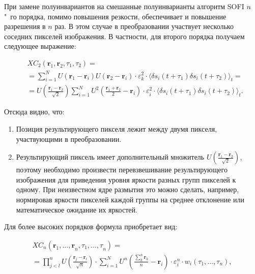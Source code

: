 При замене полуинвариантов на смешанные полуинварианты алгоритм SOFI $n$"~го порядка, помимо повышения резкости, обеспечивает и повышение разрешения в $n$ раз. В этом случае в преобразовании участвует несколько соседних пикселей изображения. В частности, для второго порядка получаем следующее выражение:

\begin{align*}
	&{XC}_2\left(\mathbf{r}_1,\mathbf{r}_2,\tau_1,\tau_2\right) = \\
	&= \sum_{i=1}^{N} {U\left(\mathbf{r}_1-\mathbf{r}_i\right)U\left(\mathbf{r}_2-\mathbf{r}_i\right)\cdot\varepsilon_k^2\cdot \langle \delta s_i\left(t+\tau_1\right)\delta s_i\left(t+\tau_2\right) \rangle_t} = \\
	&= U\left(\frac{\mathbf{r}_1-\mathbf{r}_2}{\sqrt2}\right) \sum_{i=1}^{N} {U^2\left(\frac{\mathbf{r}_1+\mathbf{r}_2}{2}-\mathbf{r}_i\right)\cdot\varepsilon_i^2\cdot \langle \delta s_i\left(t+\tau_1\right)\delta s_i\left(t+\tau_2\right) \rangle_t}.
\end{align*}

Отсюда видно, что:

\begin{enumerate}
	\item Позиция результирующего пикселя лежит между двумя пикселя, участвующими в преобразовании.
	\item Результирующий пиксель имеет дополнительный множитель $U\left(\frac{\mathbf{r}_1-\mathbf{r}_2}{\sqrt2}\right)$, поэтому необходимо произвести перевзвешивание результирующего изображения для приведения уровня яркости разных групп пикселей к одному. При неизвестном ядре размытия это можно сделать, например, нормировав яркости пикселей каждой группы на среднее отклонение или математическое ожидание их яркостей.
\end{enumerate}

Для более высоких порядков формула приобретает вид:	

\begin{equation*}
	\begin{multlined}
		{XC}_n\left(\mathbf{r}_1,{\ldots,\mathbf{r}}_n,\tau_1,{\ldots,\tau}_n \right) = \\
		= \prod_{j<l}^{n}{U\left(\frac{\mathbf{r}_j-\mathbf{r}_l}{\sqrt n}\right)} \cdot \sum_{i=1}^{N}{U^n\left(\frac{\sum_{k}^{n}\mathbf{r}_k}{n}-\mathbf{r}_i \right)\cdot\varepsilon_i^n\cdot w_i(\tau_1,\ldots,\tau_n)},
	\end{multlined}
\end{equation*}

